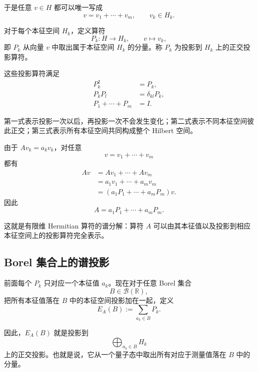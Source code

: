 \documentclass[UTF8,a4paper,11pt,openany]{ctexbook}
\begin{document}
于是任意 $v\in H$ 都可以唯一写成
\begin{equation}
    v=v_1+\cdots+v_m,
    \qquad
    v_k\in H_k.
\end{equation}

\begin{definition}[正交投影算符]
对于每个本征空间 $H_k$，定义算符
\[
P_k:H\to H_k,
\qquad
v\mapsto v_k,
\]
即 $P_k$ 从向量 $v$ 中取出属于本征空间 $H_k$ 的分量。称 $P_k$ 为投影到 $H_k$ 上的正交投影算符。
\end{definition}

这些投影算符满足
\begin{align}
    P_k^2 &= P_k,\\
    P_kP_l &= \delta_{kl}P_k,\\
    P_1+\cdots+P_m &= I.
\end{align}

第一式表示投影一次以后，再投影一次不会发生变化；第二式表示不同本征空间彼此正交；第三式表示所有本征空间共同构成整个 Hilbert 空间。

由于 $Av_k=a_kv_k$，对任意
\[
v=v_1+\cdots+v_m
\]
都有
\begin{align}
    Av
    &=
    Av_1+\cdots+Av_m
    \nonumber\\
    &=
    a_1v_1+\cdots+a_mv_m
    \nonumber\\
    &=
    (a_1P_1+\cdots+a_mP_m)v.
\end{align}
因此
\begin{equation}
    A
    =
    a_1P_1+\cdots+a_mP_m.
\end{equation}

这就是有限维 Hermitian 算符的谱分解：算符 $A$ 可以由其本征值以及投影到相应本征空间上的投影算符完全表示。

\subsection{Borel 集合上的谱投影}

前面每个 $P_k$ 只对应一个本征值 $a_k$。现在对于任意 Borel 集合
\[
B\in\mathcal B(\mathbb R),
\]
把所有本征值落在 $B$ 中的本征空间投影加在一起，定义
\begin{equation}
    E_A(B)
    :=
    \sum_{a_k\in B}P_k.
\end{equation}

因此，$E_A(B)$ 就是投影到
\[
\bigoplus_{a_k\in B}H_k
\]
上的正交投影。也就是说，它从一个量子态中取出所有对应于测量值落在 $B$ 中的分量。
\end{document}
